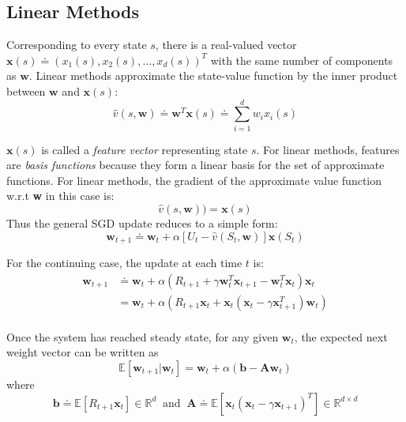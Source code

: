 \subsection{Linear Methods}
Corresponding to every state $s$, there is a real-valued vector $\textbf{x}(s) \doteq (x_1(s), x_2(s), \ldots, x_d(s))^T$ with the same number of components as $\textbf{w}$. Linear methods approximate the state-value function by the inner product between $\textbf{w}$ and $\textbf{x}(s)$:
\begin{equation}
\hat{v}(s, \textbf{w}) \doteq \textbf{w}^T\textbf{x}(s) \doteq \sum_{i=1}^{d} w_ix_i(s)
\end{equation}

$\textbf{x}(s)$ is called a \textit{feature vector} representing state $s$. For linear methods, features are \textit{basis functions} because they form a linear basis for the set of approximate functions. For linear methods, the gradient of the approximate value function w.r.t \textbf{w} in this case is:
\begin{equation}
\hat{v}(s, \textbf{w})) = \textbf{x}(s)
\end{equation}
Thus the general SGD update reduces to a simple form:
\begin{equation}
\textbf{w}_{t+1} \doteq \textbf{w}_t + \alpha \left[U_t - \hat{v}(S_t, \textbf{w})\right]\textbf{x}(S_t)
\end{equation}

For the continuing case, the update at each time $t$ is:
\begin{align}
\textbf{w}_{t+1} &\doteq \textbf{w}_t + \alpha \left(R_{t+1} + \gamma \textbf{w}_t^T\textbf{x}_{t+1} - \textbf{w}_t^T \textbf{x}_t \right)\textbf{x}_t \\
&= \textbf{w}_t + \alpha \left(R_{t+1}\textbf{x}_{t} + \textbf{x}_{t}(\textbf{x}_{t} - \gamma \textbf{x}_{t+1}^T) \textbf{w}_t \right) \\
\end{align}

Once the system has reached steady state, for any given $\textbf{w}_t$, the expected next weight vector can be written as
\begin{equation}
\mathbb{E}[\textbf{w}_{t+1}|\textbf{w}_t] = \textbf{w}_t + \alpha(\textbf{b}-\textbf{Aw}_t)
\end{equation}
where
\begin{equation}
\textbf{b} \doteq \mathbb{E}[R_{t+1} \textbf{x}_t] \in \mathbb{R}^d \; \; \text{and} \; \; \textbf{A} \doteq \mathbb{E}\left[\textbf{x}_t(\textbf{x}_t - \gamma \textbf{x}_{t+1})^T\right] \in \mathbb{R}^{d \times d}
\end{equation}

